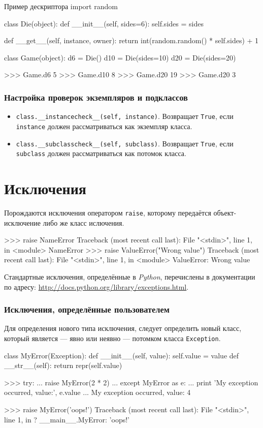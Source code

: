 \begin{pylst}{Пример дескриптора}{}
import random

class Die(object):
    def __init__(self, sides=6):
        self.sides = sides

    def __get__(self, instance, owner):
        return int(random.random() * self.sides) + 1

class Game(object):
    d6 = Die()
    d10 = Die(sides=10)
    d20 = Die(sides=20)

>>> Game.d6
5
>>> Game.d10
8
>>> Game.d20
19
>>> Game.d20
3
\end{pylst}

\subsubsection{Настройка проверок экземпляров и подклассов}
\begin{itemize}
  \item \lstinline{class.__instancecheck__(self, instance)}. Возвращает \lstinline{True}, если \lstinline{instance} должен рассматриваться как экземпляр класса.
  \item \lstinline{class.__subclasscheck__(self, subclass)}. Возвращает \lstinline{True}, если \lstinline{subclass} должен рассматриваться как потомок класса.
\end{itemize}

\section{Исключения}
\label{sec:py-exceptions}

Порождаются исключения оператором \lstinline{raise}, которому передаётся объект-исключение либо же класс ислючения.
\begin{pylst}{}{}
>>> raise NameError
Traceback (most recent call last):
  File "<stdin>", line 1, in <module>
NameError
>>> raise ValueError("Wrong value")
Traceback (most recent call last):
  File "<stdin>", line 1, in <module>
ValueError: Wrong value
\end{pylst}

Стандартные исключения, определённые в \emph{Python}, перечислены в документации по адресу: \url{http://docs.python.org/library/exceptions.html}.

\subsubsection{Исключения, определённые пользователем}
Для определения нового типа исключения, следует определить новый класс, который является — явно или неявно — потомком класса \lstinline{Exception}.
\begin{pylst}{}{}
class MyError(Exception):
    def __init__(self, value):
        self.value = value
    def __str__(self):
        return repr(self.value)

>>> try:
...     raise MyError(2 * 2)
... except MyError as e:
...     print 'My exception occurred, value:', e.value
...
My exception occurred, value: 4

>>> raise MyError('oops!')
Traceback (most recent call last):
  File "<stdin>", line 1, in ?
__main__.MyError: 'oops!'
\end{pylst}

